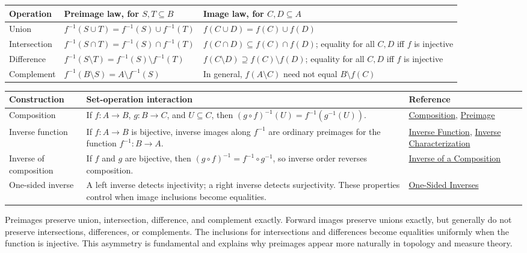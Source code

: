 \begin{remark*}
\mbox{}\par\smallskip
\small
\begin{tabularx}{\textwidth}{l X X}
\toprule
\textbf{Operation} & \textbf{Preimage law, for $S,T\subseteq B$} & \textbf{Image law, for $C,D\subseteq A$} \\
\midrule
Union
& $f^{-1}(S\cup T)=f^{-1}(S)\cup f^{-1}(T)$
& $f(C\cup D)=f(C)\cup f(D)$ \\
Intersection
& $f^{-1}(S\cap T)=f^{-1}(S)\cap f^{-1}(T)$
& $f(C\cap D)\subseteq f(C)\cap f(D)$; equality for all $C,D$ iff $f$ is injective \\
Difference
& $f^{-1}(S\setminus T)=f^{-1}(S)\setminus f^{-1}(T)$
& $f(C\setminus D)\supseteq f(C)\setminus f(D)$; equality for all $C,D$ iff $f$ is injective \\
Complement
& $f^{-1}(B\setminus S)=A\setminus f^{-1}(S)$
& In general, $f(A\setminus C)$ need not equal $B\setminus f(C)$ \\
\bottomrule
\end{tabularx}
\end{remark*}

\begin{remark*}
\mbox{}\par\smallskip
\small
\begin{tabularx}{\textwidth}{l X X}
\toprule
\textbf{Construction} & \textbf{Set-operation interaction} & \textbf{Reference} \\
\midrule
Composition
& If $f:A\to B$, $g:B\to C$, and $U\subseteq C$, then
$(g\circ f)^{-1}(U)=f^{-1}(g^{-1}(U))$.
& \hyperref[def:composition]{Composition}, \hyperref[def:preimage]{Preimage} \\
Inverse function
& If $f:A\to B$ is bijective, inverse images along $f^{-1}$ are ordinary
preimages for the function $f^{-1}:B\to A$.
& \hyperref[def:inverse]{Inverse Function}, \hyperref[thm:inverse-char]{Inverse Characterization} \\
Inverse of composition
& If $f$ and $g$ are bijective, then
$(g\circ f)^{-1}=f^{-1}\circ g^{-1}$, so inverse order reverses composition.
& \hyperref[thm:inverse-comp]{Inverse of a Composition} \\
One-sided inverse
& A left inverse detects injectivity; a right inverse detects surjectivity.
These properties control when image inclusions become equalities.
& \hyperref[thm:one-sided]{One-Sided Inverses} \\
\bottomrule
\end{tabularx}
\end{remark*}

\begin{remark*}
Preimages preserve union, intersection, difference, and complement exactly.
Forward images preserve unions exactly, but generally do not preserve
intersections, differences, or complements. The inclusions for intersections
and differences become equalities uniformly when the function is injective.
This asymmetry is fundamental and explains why preimages appear more naturally
in topology and measure theory.
\end{remark*}
